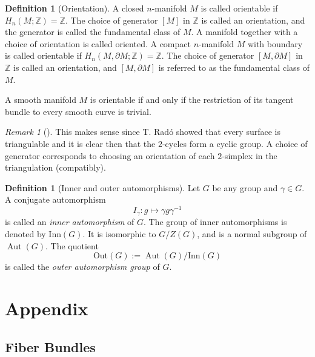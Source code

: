 \documentclass[reqno]{amsart}
\theoremstyle{definition}
\newtheorem{definition}[theorem]{Definition}
\theoremstyle{remark}
\newtheorem*{remark}{Remark}
\DeclareMathOperator{\Aut}{Aut}
\begin{document}
\begin{definition}[Orientation]
    A closed $n$-manifold $M$ is called orientable
    if $H_n \left( M ; \mathbb{Z} \right) = \mathbb{Z}$.
    The choice of generator $\left[ M \right] $ in
    $\mathbb{Z}$ is called an orientation, and the generator
    is called the fundamental class of $M$. A manifold
    together with a choice of orientation is
    called oriented. A compact $n$-manifold $M$ with
    boundary is called orientable if
    $H_n \left( M, \partial M ; \mathbb{Z} \right) = \mathbb{Z}$.
    The choice of generator $\left[ M, \partial M \right] $ in
    $\mathbb{Z}$ is called an orientation, and
    $\left[ M, \partial M \right] $ is referred to as
    the fundamental class of $M$.

    A smooth manifold $M$ is orientable if and only if
    the restriction of its tangent bundle to every smooth
    curve is trivial.

    \begin{remark}[]
        This makes sense since T. Radó showed that every surface
        is triangulable and it is clear then that the $2$-cycles
        form a cyclic group. A choice of generator corresponds
        to choosing an orientation of each $2$-simplex in the
        triangulation (compatibly).
    \end{remark}
\end{definition}

\begin{definition}[Inner and outer automorphisms]
    Let $G$ be any group and $\gamma \in G$. A conjugate
    automorphism 
    \[
    I_{\gamma} \colon g \mapsto \gamma g \gamma^{-1}
    \] 
    is called an \textit{inner automorphism} of $G$.
    The group of inner automorphisms is denoted
    by $\text{Inn}(G)$. It is isomorphic to
    $G / Z(G)$, and is a normal subgroup of
    $\Aut(G)$. The quotient
    \[
    \text{Out}(G) := \Aut(G) / \text{Inn}(G)
    \] 
    is called the \textit{outer automorphism group} of
    $G$.
\end{definition}




\section{Appendix}

\subsection{Fiber Bundles}
\end{document}
